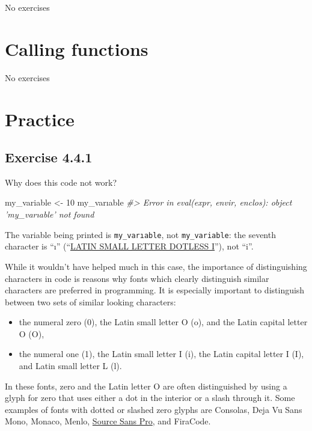 \documentclass[]{book}
\newenvironment{Shaded}{\begin{snugshade}}{\end{snugshade}}
\newcommand{\CommentTok}[1]{\textcolor[rgb]{0.56,0.35,0.01}{\textit{#1}}}
\newcommand{\DecValTok}[1]{\textcolor[rgb]{0.00,0.00,0.81}{#1}}
\newcommand{\NormalTok}[1]{#1}
\newcommand{\StringTok}[1]{\textcolor[rgb]{0.31,0.60,0.02}{#1}}
\providecommand{\tightlist}{%
  \setlength{\itemsep}{0pt}\setlength{\parskip}{0pt}}
\theoremstyle{plain}
\theoremstyle{remark}
\begin{document}
No exercises

\hypertarget{calling-functions}{%
\section{Calling functions}\label{calling-functions}}

No exercises

\hypertarget{practice}{%
\section{Practice}\label{practice}}

\hypertarget{exercise-4.4.1}{%
\subsection*{\texorpdfstring{Exercise {4.4.1}}{Exercise 4.4.1}}\label{exercise-4.4.1}}

Why does this code not work?

\begin{Shaded}
\begin{Highlighting}[]
\NormalTok{my_variable <-}\StringTok{ }\DecValTok{10}
\NormalTok{my_varıable}
\CommentTok{#> Error in eval(expr, envir, enclos): object 'my_varıable' not found}
\end{Highlighting}
\end{Shaded}

The variable being printed is \texttt{my\_varıable}, not \texttt{my\_variable}:
the seventh character is ``ı'' (``\href{https://en.wikipedia.org/wiki/Dotted_and_dotless_I}{LATIN SMALL LETTER DOTLESS I}''), not ``i''.

While it wouldn't have helped much in this case, the importance of
distinguishing characters in code is reasons why fonts which clearly
distinguish similar characters are preferred in programming.
It is especially important to distinguish between two sets of similar looking characters:

\begin{itemize}
\tightlist
\item
  the numeral zero (0), the Latin small letter O (o), and the Latin capital letter O (O),
\item
  the numeral one (1), the Latin small letter I (i), the Latin capital letter I (I), and Latin small letter L (l).
\end{itemize}

In these fonts, zero and the Latin letter O are often distinguished by using a glyph for zero that uses either a dot in the interior or a slash through it.
Some examples of fonts with dotted or slashed zero glyphs are Consolas, Deja Vu Sans Mono, Monaco, Menlo, \href{https://adobe-fonts.github.io/source-sans-pro/}{Source Sans Pro}, and FiraCode.
\end{document}
